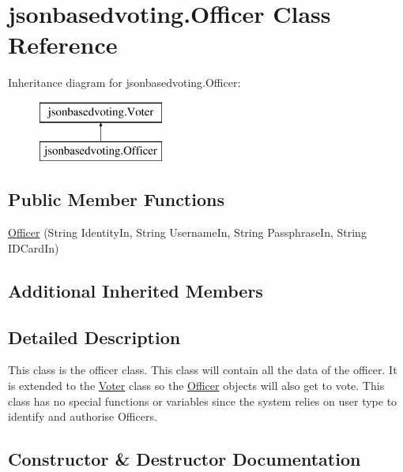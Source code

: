 \hypertarget{classjsonbasedvoting_1_1_officer}{}\section{jsonbasedvoting.\+Officer Class Reference}
\label{classjsonbasedvoting_1_1_officer}
Inheritance diagram for jsonbasedvoting.\+Officer\+:\begin{figure}[H]
\begin{center}
\leavevmode
\includegraphics[height=2.000000cm]{classjsonbasedvoting_1_1_officer}
\end{center}
\end{figure}
\subsection*{Public Member Functions}
\begin{DoxyCompactItemize}
\item 
\mbox{\hyperlink{classjsonbasedvoting_1_1_officer_acdff517e349bf16a8e89f28ccefd3166}{Officer}} (String Identity\+In, String Username\+In, String Passphrase\+In, String I\+D\+Card\+In)
\end{DoxyCompactItemize}
\subsection*{Additional Inherited Members}


\subsection{Detailed Description}
This class is the officer class. This class will contain all the data of the officer. It is extended to the \mbox{\hyperlink{classjsonbasedvoting_1_1_voter}{Voter}} class so the \mbox{\hyperlink{classjsonbasedvoting_1_1_officer}{Officer}} objects will also get to vote. This class has no special functions or variables since the system relies on user type to identify and authorise Officers. 

\subsection{Constructor \& Destructor Documentation}
\mbox{\label{classjsonbasedvoting_1_1_officer_acdff517e349bf16a8e89f28ccefd3166}} 
